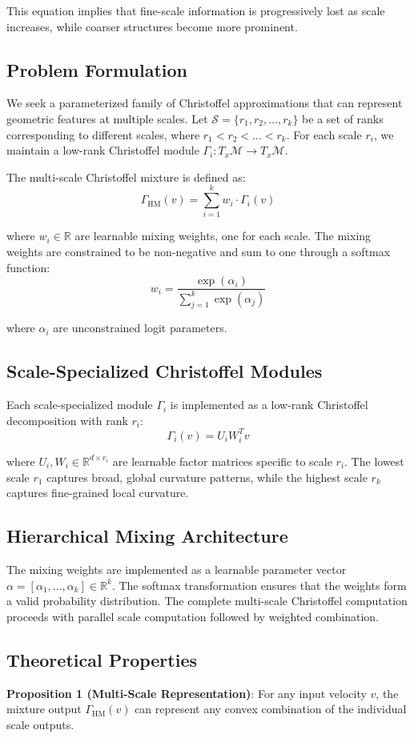 This equation implies that fine-scale information is progressively lost as scale increases, while coarser structures become more prominent.

\subsection{Problem Formulation}
We seek a parameterized family of Christoffel approximations that can represent geometric features at multiple scales. Let $\mathcal{S} = \{r_1, r_2, ..., r_k\}$ be a set of ranks corresponding to different scales, where $r_1 < r_2 < ... < r_k$. For each scale $r_i$, we maintain a low-rank Christoffel module $\Gamma_i: T_x\mathcal{M} \to T_x\mathcal{M}$.

The multi-scale Christoffel mixture is defined as:
$$\Gamma_{\text{HM}}(v) = \sum_{i=1}^k w_i \cdot \Gamma_i(v)$$

where $w_i \in \mathbb{R}$ are learnable mixing weights, one for each scale. The mixing weights are constrained to be non-negative and sum to one through a softmax function:
$$w_i = \frac{\exp(\alpha_i)}{\sum_{j=1}^k \exp(\alpha_j)}$$

where $\alpha_i$ are unconstrained logit parameters.

\subsection{Scale-Specialized Christoffel Modules}
Each scale-specialized module $\Gamma_i$ is implemented as a low-rank Christoffel decomposition with rank $r_i$:
$$\Gamma_i(v) = U_i W_i^T v$$

where $U_i, W_i \in \mathbb{R}^{d \times r_i}$ are learnable factor matrices specific to scale $r_i$. The lowest scale $r_1$ captures broad, global curvature patterns, while the highest scale $r_k$ captures fine-grained local curvature.

\subsection{Hierarchical Mixing Architecture}
The mixing weights are implemented as a learnable parameter vector $\alpha = [\alpha_1, ..., \alpha_k] \in \mathbb{R}^k$. The softmax transformation ensures that the weights form a valid probability distribution. The complete multi-scale Christoffel computation proceeds with parallel scale computation followed by weighted combination.

\subsection{Theoretical Properties}
\textbf{Proposition 1 (Multi-Scale Representation)}: For any input velocity $v$, the mixture output $\Gamma_{\text{HM}}(v)$ can represent any convex combination of the individual scale outputs.

